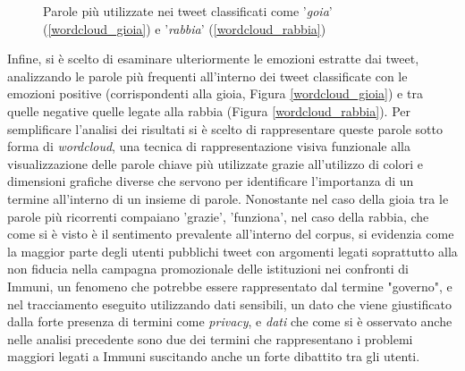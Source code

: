\begin{figure}[H]
	\centering
	\quad
	\quad
	\setlength{\belowcaptionskip}{-10pt}
	\caption{Parole più utilizzate nei tweet classificati come '\textit{goia}' (\ref{wordcloud_gioia}) e '\textit{rabbia}' (\ref{wordcloud_rabbia})}
	\label{fig: wordclouds}
\end{figure}

Infine, si è scelto di esaminare ulteriormente le emozioni estratte dai tweet, analizzando le parole più frequenti all'interno dei tweet classificate con le emozioni positive (corrispondenti alla gioia, Figura \ref{wordcloud_gioia}) e tra quelle negative quelle legate alla rabbia (Figura \ref{wordcloud_rabbia}).
Per semplificare l'analisi dei risultati si è scelto di rappresentare queste parole sotto forma di \textit{wordcloud}, una tecnica di rappresentazione visiva funzionale alla visualizzazione delle parole chiave più utilizzate grazie all'utilizzo di colori e dimensioni grafiche diverse che servono per identificare l'importanza di un termine all'interno di un insieme di parole. Nonostante nel caso della gioia tra le parole più ricorrenti compaiano 'grazie', 'funziona', nel caso della rabbia, che come si è visto è il sentimento prevalente all'interno del corpus, si evidenzia come la maggior parte degli utenti pubblichi tweet con argomenti legati soprattutto alla non fiducia nella campagna promozionale delle istituzioni nei confronti di Immuni, un fenomeno che potrebbe essere rappresentato dal termine "governo", e nel tracciamento eseguito utilizzando dati sensibili, un dato che viene giustificato dalla forte presenza di termini come \textit{privacy}, e \textit{dati} che come si è osservato anche nelle analisi precedente sono due dei termini che rappresentano i problemi maggiori legati a Immuni suscitando anche un forte dibattito tra gli utenti.


